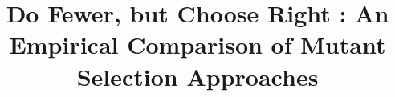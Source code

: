 \title{Do Fewer, but Choose Right : An Empirical Comparison of Mutant Selection Approaches}
\subtitle{}
